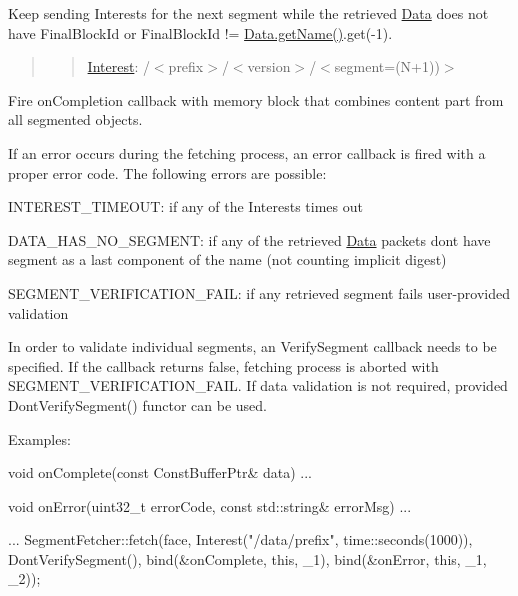 \begin{DoxyEnumerate}
\item Keep sending Interests for the next segment while the retrieved \hyperlink{classndn_1_1Data}{Data} does not have Final\+Block\+Id or Final\+Block\+Id != \hyperlink{classndn_1_1Data_a14ed396d06bf43b86e4b0a67a4866303}{Data.\+get\+Name()}.get(-\/1).
\end{DoxyEnumerate}

\begin{quote}
\begin{quote}
\hyperlink{classndn_1_1Interest}{Interest}\+: /$<$prefix$>$/$<$version$>$/$<$segment=(N+1))$>$ \end{quote}
\end{quote}



\begin{DoxyEnumerate}
\item Fire on\+Completion callback with memory block that combines content part from all segmented objects.
\end{DoxyEnumerate}

If an error occurs during the fetching process, an error callback is fired with a proper error code. The following errors are possible\+:


\begin{DoxyItemize}
\item {\ttfamily I\+N\+T\+E\+R\+E\+S\+T\+\_\+\+T\+I\+M\+E\+O\+UT}\+: if any of the Interests times out
\item {\ttfamily D\+A\+T\+A\+\_\+\+H\+A\+S\+\_\+\+N\+O\+\_\+\+S\+E\+G\+M\+E\+NT}\+: if any of the retrieved \hyperlink{classndn_1_1Data}{Data} packets don\textquotesingle{}t have segment as a last component of the name (not counting implicit digest)
\item {\ttfamily S\+E\+G\+M\+E\+N\+T\+\_\+\+V\+E\+R\+I\+F\+I\+C\+A\+T\+I\+O\+N\+\_\+\+F\+A\+IL}\+: if any retrieved segment fails user-\/provided validation
\end{DoxyItemize}

In order to validate individual segments, an Verify\+Segment callback needs to be specified. If the callback returns false, fetching process is aborted with S\+E\+G\+M\+E\+N\+T\+\_\+\+V\+E\+R\+I\+F\+I\+C\+A\+T\+I\+O\+N\+\_\+\+F\+A\+IL. If data validation is not required, provided Dont\+Verify\+Segment() functor can be used.

Examples\+: \begin{DoxyVerb}void
onComplete(const ConstBufferPtr& data)
{
  ...
}

void
onError(uint32_t errorCode, const std::string& errorMsg)
{
  ...
}

...
SegmentFetcher::fetch(face, Interest("/data/prefix", time::seconds(1000)),
                      DontVerifySegment(),
                      bind(&onComplete, this, _1),
                      bind(&onError, this, _1, _2));\end{DoxyVerb}
 

